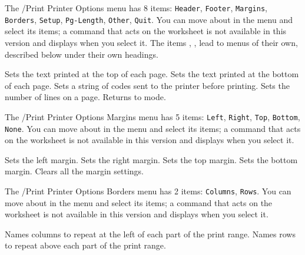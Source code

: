 The /Print Printer Options menu has 8 items: \texttt{Header}, \texttt{Footer}, \texttt{Margins}, \texttt{Borders}, \texttt{Setup}, \texttt{Pg-Length}, \texttt{Other}, \texttt{Quit}.  You can move about in the menu and select its items; a command that acts on the worksheet is not available in this version and displays  when you select it.
The items , ,  lead to menus of their own, described below under their own headings.
\begin{Options}
 Sets the text printed at the top of each page.
 Sets the text printed at the bottom of each page.
 Sets a string of codes sent to the printer before printing.
 Sets the number of lines on a page.
 Returns to  mode.
\end{Options}

The /Print Printer Options Margins menu has 5 items: \texttt{Left}, \texttt{Right}, \texttt{Top}, \texttt{Bottom}, \texttt{None}.  You can move about in the menu and select its items; a command that acts on the worksheet is not available in this version and displays  when you select it.
\begin{Options}
 Sets the left margin.
 Sets the right margin.
 Sets the top margin.
 Sets the bottom margin.
 Clears all the margin settings.
\end{Options}

The /Print Printer Options Borders menu has 2 items: \texttt{Columns}, \texttt{Rows}.  You can move about in the menu and select its items; a command that acts on the worksheet is not available in this version and displays  when you select it.
\begin{Options}
 Names columns to repeat at the left of each part of the print range.
 Names rows to repeat above each part of the print range.
\end{Options}

